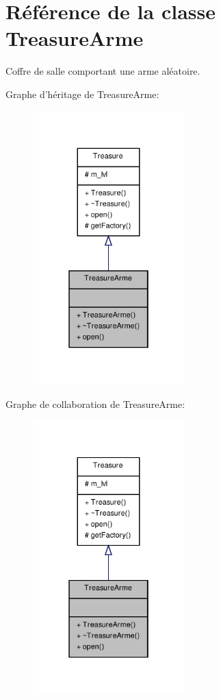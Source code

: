 \hypertarget{class_treasure_arme}{\section{Référence de la classe Treasure\-Arme}
\label{class_treasure_arme}
}


Coffre de salle comportant une arme aléatoire.  




Graphe d'héritage de Treasure\-Arme\-:
\nopagebreak
\begin{figure}[H]
\begin{center}
\leavevmode
\includegraphics[width=166pt]{class_treasure_arme__inherit__graph}
\end{center}
\end{figure}


Graphe de collaboration de Treasure\-Arme\-:
\nopagebreak
\begin{figure}[H]
\begin{center}
\leavevmode
\includegraphics[width=166pt]{class_treasure_arme__coll__graph}
\end{center}
\end{figure}
